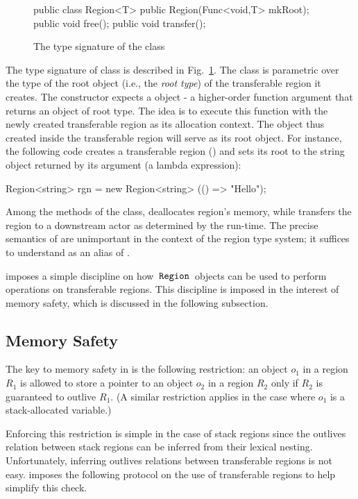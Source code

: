 \begin{figure}
\begin{codejava}
  public class Region<T> {
    public Region(Func<void,T> mkRoot);
    public void free();
    public void transfer();
  }
\end{codejava}
\caption{The type signature of the  class}
\label{fig:region-class}
\end{figure}
The type signature of  class is described in
Fig.~\ref{fig:region-class}. The class is parametric over the type of
the root object (i.e., the \emph{root type}) of the transferable
region it creates. The  constructor expects a 
object - a higher-order function argument that returns an object of
root type.  The idea is to execute this function with the newly
created transferable region as its allocation context. The object thus
created inside the transferable region will serve as its root object.
For instance, the following code creates a transferable region
() and sets its root to the string object returned by its
 argument (a lambda expression):
\begin{codejava}
  Region<string> rgn = new Region<string>
                        (() => "Hello");
\end{codejava}
Among the methods of the  class,  deallocates
region's memory, while  transfers the region to a
downstream actor as determined by the run-time. The precise semantics
of  are unimportant in the context of the region type
system; it suffices to understand  as an alias of
.

\name imposes a simple discipline on how $\,{\tt Region}\,$ objects can be used
to perform operations on transferable regions. This discipline is
imposed in the interest of memory safety, which is discussed in the
following subsection.

\subsection{Memory Safety}
\label{sec:memory-safety}

The key to memory safety in \name is the following restriction:
an object $o_1$ in a region $R_1$ is allowed to store a pointer to
an object $o_2$ in a region $R_2$ only if $R_2$ is guaranteed to outlive $R_1$.
(A similar restriction applies in the case where $o_1$ is a stack-allocated variable.)

Enforcing this restriction is simple in the case of stack regions since the outlives relation
between stack regions can be inferred from their lexical nesting. Unfortunately,
inferring outlives relations between transferable regions is not easy.
\name imposes the following protocol on the use of transferable regions to help simplify
this check.

